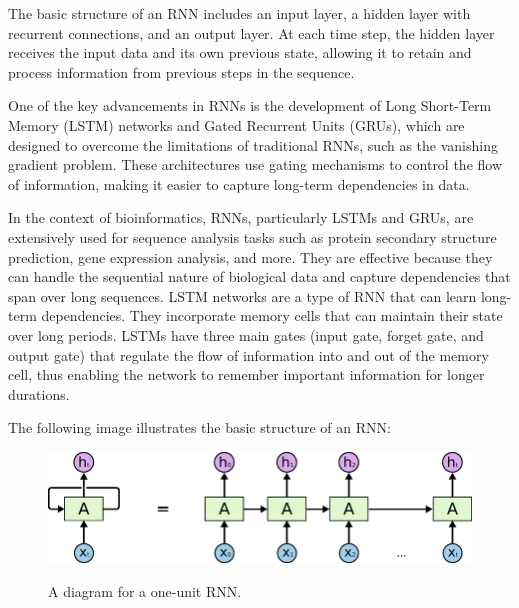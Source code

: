 The basic structure of an RNN includes an input layer, a hidden layer with recurrent connections, and an output layer. At each time step, the hidden layer receives the input data and its own previous state, allowing it to retain and process information from previous steps in the sequence.

One of the key advancements in RNNs is the development of Long Short-Term Memory (LSTM) networks and Gated Recurrent Units (GRUs), which are designed to overcome the limitations of traditional RNNs, such as the vanishing gradient problem. These architectures use gating mechanisms to control the flow of information, making it easier to capture long-term dependencies in data.

In the context of bioinformatics, RNNs, particularly LSTMs and GRUs, are extensively used for sequence analysis tasks such as protein secondary structure prediction, gene expression analysis, and more. They are effective because they can handle the sequential nature of biological data and capture dependencies that span over long sequences. LSTM networks are a type of RNN that can learn long-term dependencies. They incorporate memory cells that can maintain their state over long periods. LSTMs have three main gates (input gate, forget gate, and output gate) that regulate the flow of information into and out of the memory cell, thus enabling the network to remember important information for longer durations. \autocite{hochreiterLongShortTermMemory1997}

The following image illustrates the basic structure of an RNN:

\begin{figure}[!htbp]
    \centering
    \begin{minipage}[t]{\textwidth}
    \caption{A diagram for a one-unit RNN.}
    \includegraphics[width=1\textwidth]{img/Recurrent Neural Network Unfold.png}\\
    \label{fig:recurrent-neural-network}
    \end{minipage}
\end{figure}

